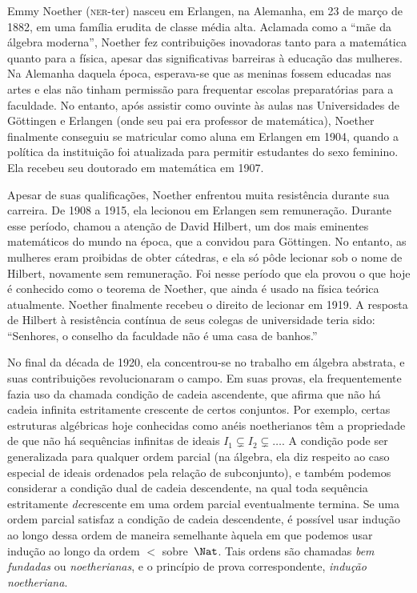 \documentclass[../../../include/open-logic-section]{subfiles}
\begin{document}



Emmy Noether (\textsc{ner}-ter) nasceu em Erlangen, na Alemanha, em
23 de março de 1882, em uma família erudita de classe média alta. Aclamada
como a ``mãe da álgebra moderna'', Noether fez contribuições inovadoras tanto
para a matemática quanto para a física, apesar das significativas barreiras à
educação das mulheres. Na Alemanha daquela época, esperava-se que as meninas
fossem educadas nas artes e elas não tinham permissão para frequentar escolas
preparatórias para a faculdade. No entanto, após assistir como ouvinte às
aulas nas Universidades de G\"{o}ttingen e Erlangen (onde seu pai era
professor de matemática), Noether finalmente conseguiu se matricular como
aluna em Erlangen em 1904, quando a política da instituição foi atualizada
para permitir estudantes do sexo feminino. Ela recebeu seu doutorado em
matemática em 1907.

Apesar de suas qualificações, Noether enfrentou muita resistência durante
sua carreira. De 1908 a 1915, ela lecionou em Erlangen sem remuneração.
Durante esse período, chamou a atenção de David Hilbert, um dos mais
eminentes matemáticos do mundo na época, que a convidou para G\"{o}ttingen.
No entanto, as mulheres eram proibidas de obter cátedras, e ela só pôde
lecionar sob o nome de Hilbert, novamente sem remuneração. Foi nesse período
que ela provou o que hoje é conhecido como o teorema de Noether, que ainda é
usado na física teórica atualmente. Noether finalmente recebeu o direito de
lecionar em 1919. A resposta de Hilbert à resistência contínua de seus
colegas de universidade teria sido: ``Senhores, o conselho da faculdade não é
uma casa de banhos.''

No final da década de 1920, ela concentrou-se no trabalho em álgebra abstrata,
e suas contribuições revolucionaram o campo. Em suas provas, ela frequentemente
fazia uso da chamada condição de cadeia ascendente, que afirma que não há
cadeia infinita estritamente crescente de certos conjuntos. Por
exemplo, certas estruturas algébricas hoje conhecidas como anéis noetherianos
têm a propriedade de que não há sequências infinitas de ideais $I_1
\subsetneq I_2 \subsetneq \dots$. A condição pode ser generalizada para
qualquer ordem parcial (na álgebra, ela diz respeito ao caso especial de
ideais ordenados pela relação de subconjunto), e também podemos considerar a
condição dual de cadeia descendente, na qual toda sequência estritamente
\emph{de}crescente em uma ordem parcial eventualmente termina. Se uma ordem
parcial satisfaz a condição de cadeia descendente, é possível usar
indução ao longo dessa ordem de maneira semelhante àquela em que podemos usar
indução ao longo da ordem $<$ sobre~$\Nat$. Tais ordens são chamadas
\emph{bem fundadas} ou \emph{noetherianas}, e o princípio de prova
correspondente, \emph{indução noetheriana}.
\end{document}
